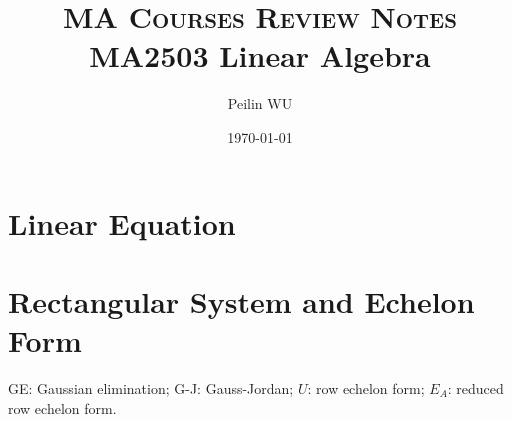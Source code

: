 \documentclass[]{article}
\begin{document}
 
\title{\textsc{MA Courses Review Notes}\\MA2503 Linear Algebra}
\author{Peilin \textsc{WU}
} 
\date{\today}


\maketitle
\tableofcontents

\newpage
\section{Linear Equation}
\section{Rectangular System and Echelon Form}
GE: Gaussian elimination; G-J: Gauss-Jordan; $U$: row echelon form; $E_A$: reduced row echelon form.
\end{document}
